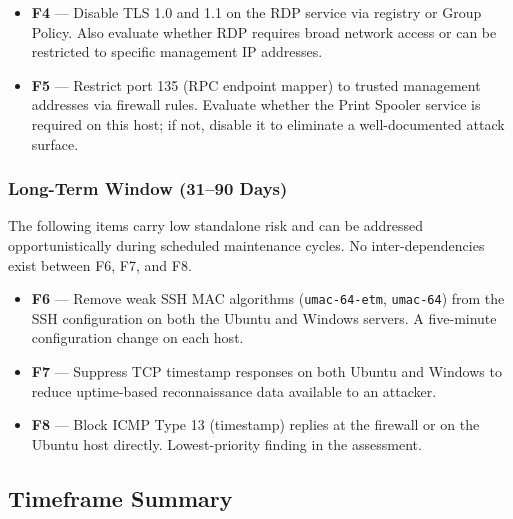 \documentclass[12pt]{article}
\begin{document}
\begin{itemize}[leftmargin=1.5em]
  \item \textbf{F4} --- Disable TLS 1.0 and 1.1 on the RDP service via registry
    or Group Policy. Also evaluate whether RDP requires broad network access or
    can be restricted to specific management IP addresses.
 
  \item \textbf{F5} --- Restrict port 135 (RPC endpoint mapper) to trusted
    management addresses via firewall rules. Evaluate whether the Print Spooler
    service is required on this host; if not, disable it to eliminate a
    well-documented attack surface.
\end{itemize}
 
\subsubsection*{Long-Term Window (31--90 Days)}
 
The following items carry low standalone risk and can be addressed
opportunistically during scheduled maintenance cycles. No inter-dependencies
exist between F6, F7, and F8.
 
\begin{itemize}[leftmargin=1.5em]
  \item \textbf{F6} --- Remove weak SSH MAC algorithms (\texttt{umac-64-etm},
    \texttt{umac-64}) from the SSH configuration on both the Ubuntu and Windows
    servers. A five-minute configuration change on each host.
 
  \item \textbf{F7} --- Suppress TCP timestamp responses on both Ubuntu and
    Windows to reduce uptime-based reconnaissance data available to an attacker.
 
  \item \textbf{F8} --- Block ICMP Type 13 (timestamp) replies at the firewall
    or on the Ubuntu host directly. Lowest-priority finding in the assessment.
\end{itemize}
 
\subsection{Timeframe Summary}
 
\bigskip
 
\end{document}

